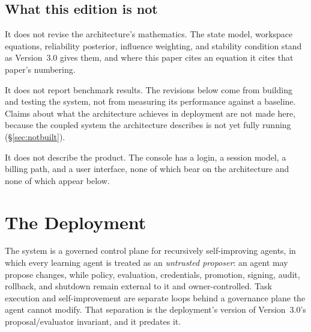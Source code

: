 \documentclass[11pt]{article}
\begin{document}
\subsection{What this edition is not}

It does not revise the architecture's mathematics. The state model, workspace equations, reliability posterior, influence weighting, and stability condition stand as Version~3.0 gives them, and where this paper cites an equation it cites that paper's numbering.

It does not report benchmark results. The revisions below come from building and testing the system, not from measuring its performance against a baseline. Claims about what the architecture achieves in deployment are not made here, because the coupled system the architecture describes is not yet fully running (\S\ref{sec:notbuilt}).

It does not describe the product. The console has a login, a session model, a billing path, and a user interface, none of which bear on the architecture and none of which appear below.

\section{The Deployment}
\label{sec:deployment}

The system is a governed control plane for recursively self-improving agents, in which every learning agent is treated as an \emph{untrusted proposer}: an agent may propose changes, while policy, evaluation, credentials, promotion, signing, audit, rollback, and shutdown remain external to it and owner-controlled. Task execution and self-improvement are separate loops behind a governance plane the agent cannot modify. That separation is the deployment's version of Version~3.0's proposal/evaluator invariant, and it predates it.
\end{document}
